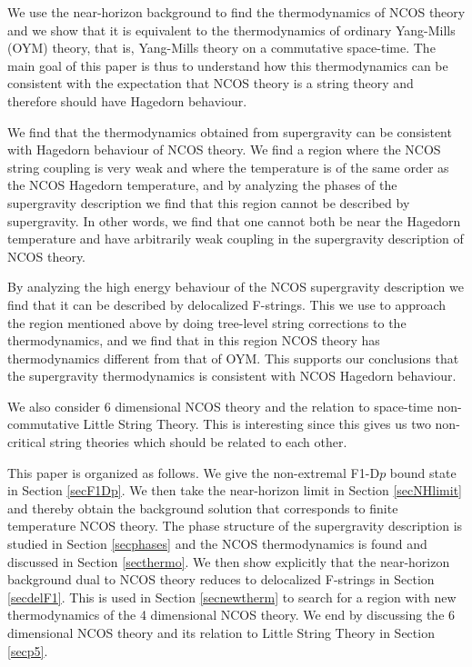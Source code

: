 \documentclass[a4paper,twoside,titlepage,12pt]{article}
\begin{document}
We use the near-horizon background to find the thermodynamics of NCOS theory
and we show that it is equivalent to the thermodynamics of 
ordinary Yang-Mills (OYM) theory, that is, Yang-Mills theory on a commutative
space-time.
The main goal of this paper is thus to understand how this thermodynamics
can be consistent with the expectation that NCOS theory is a string theory
and therefore should have Hagedorn behaviour.

We find that the thermodynamics obtained from supergravity
can be consistent with Hagedorn behaviour of NCOS theory. 
We find a region where the NCOS string coupling is very weak
and where the temperature is of the same order as the 
NCOS Hagedorn temperature, and by analyzing 
the phases of the supergravity description we find that this region 
cannot be described by supergravity. 
In other words, we find that one cannot both be near the Hagedorn 
temperature and have arbitrarily weak coupling 
in the supergravity description of NCOS theory.

By analyzing the high energy behaviour of the NCOS supergravity description
we find that it can be described by delocalized F-strings. 
This we use to approach the region mentioned above by doing tree-level
string corrections to the thermodynamics, and we find that
in this region NCOS theory has thermodynamics different from that of OYM.
This supports our conclusions that the supergravity thermodynamics
is consistent with NCOS Hagedorn behaviour.

We also consider 6 dimensional NCOS theory and the relation 
to space-time non-commutative Little String Theory. 
This is interesting since this gives us two
non-critical string theories which should be related to each other.

This paper is organized as follows. 
We give the 
non-extremal F1-D$p$ bound state in Section \ref{secF1Dp}.
We then take the near-horizon limit in Section \ref{secNHlimit}
and thereby obtain the background solution
that corresponds to finite temperature NCOS theory.
The phase structure of the supergravity description is studied in
Section \ref{secphases} and the NCOS thermodynamics is found and
discussed in Section \ref{secthermo}. 
We then show explicitly that the near-horizon background dual to NCOS theory
reduces to delocalized F-strings in Section \ref{secdelF1}.
This is used in Section \ref{secnewtherm} to search for a region
with new thermodynamics of the 4 dimensional NCOS theory.
We end by discussing the 6 dimensional NCOS theory and its relation to
Little String Theory in Section \ref{secp5}.
\end{document}
